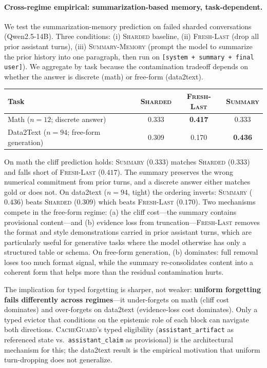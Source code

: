 \documentclass{article}
\begin{document}
\paragraph{Cross-regime empirical: summarization-based memory, task-dependent.}
We test the summarization-memory prediction on failed sharded conversations (Qwen2.5-14B). Three conditions: (i) \textsc{Sharded} baseline, (ii) \textsc{Fresh-Last} (drop all prior assistant turns), (iii) \textsc{Summary-Memory} (prompt the model to summarize the prior history into one paragraph, then run on \texttt{[system + summary + final user]}). We aggregate by task because the contamination tradeoff depends on whether the answer is discrete (math) or free-form (data2text).
\begin{center}
\small
\begin{tabular}{lccc}
\toprule
Task & \textsc{Sharded} & \textsc{Fresh-Last} & \textsc{Summary} \\
\midrule
Math ($n{=}12$; discrete answer) & 0.333 & \textbf{0.417} & 0.333 \\
Data2Text ($n{=}94$; free-form generation) & 0.309 & 0.170 & \textbf{0.436} \\
\bottomrule
\end{tabular}
\end{center}
\noindent On math the cliff prediction holds: \textsc{Summary} ($0.333$) matches \textsc{Sharded} ($0.333$) and falls short of \textsc{Fresh-Last} ($0.417$). The summary preserves the wrong numerical commitment from prior turns, and a discrete answer either matches gold or does not. On data2text ($n{=}94$, tight) the ordering inverts: \textsc{Summary} ($0.436$) beats \textsc{Sharded} ($0.309$) which beats \textsc{Fresh-Last} ($0.170$). Two mechanisms compete in the free-form regime: (a) the cliff cost---the summary contains provisional content---and (b) evidence loss from truncation---\textsc{Fresh-Last} removes the format and style demonstrations carried in prior assistant turns, which are particularly useful for generative tasks where the model otherwise has only a structured table or schema. On free-form generation, (b) dominates: full removal loses too much format signal, while the summary re-consolidates content into a coherent form that helps more than the residual contamination hurts.

The implication for typed forgetting is sharper, not weaker: \textbf{uniform forgetting fails differently across regimes}---it under-forgets on math (cliff cost dominates) and over-forgets on data2text (evidence-loss cost dominates). Only a typed evictor that conditions on the epistemic role of each block can navigate both directions. \textsc{CacheGuard}'s typed eligibility (\texttt{assistant\_artifact} as referenced state vs.\ \texttt{assistant\_claim} as provisional) is the architectural mechanism for this; the data2text result is the empirical motivation that uniform turn-dropping does not generalize.
\end{document}
